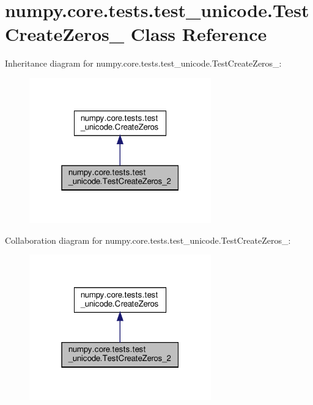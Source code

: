\hypertarget{classnumpy_1_1core_1_1tests_1_1test__unicode_1_1TestCreateZeros__2}{}\section{numpy.\+core.\+tests.\+test\+\_\+unicode.\+Test\+Create\+Zeros\+\_ Class Reference}
\label{classnumpy_1_1core_1_1tests_1_1test__unicode_1_1TestCreateZeros__2}


Inheritance diagram for numpy.\+core.\+tests.\+test\+\_\+unicode.\+Test\+Create\+Zeros\+\_\+:
\nopagebreak
\begin{figure}[H]
\begin{center}
\leavevmode
\includegraphics[width=223pt]{classnumpy_1_1core_1_1tests_1_1test__unicode_1_1TestCreateZeros__2__inherit__graph}
\end{center}
\end{figure}


Collaboration diagram for numpy.\+core.\+tests.\+test\+\_\+unicode.\+Test\+Create\+Zeros\+\_\+:
\nopagebreak
\begin{figure}[H]
\begin{center}
\leavevmode
\includegraphics[width=223pt]{classnumpy_1_1core_1_1tests_1_1test__unicode_1_1TestCreateZeros__2__coll__graph}
\end{center}
\end{figure}
